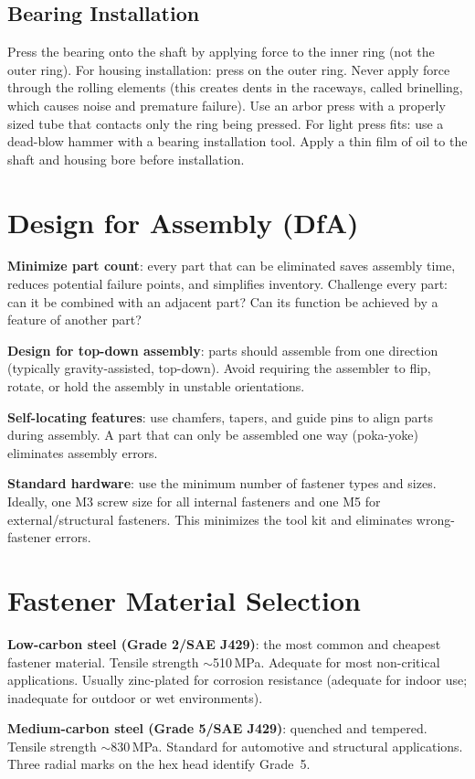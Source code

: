 \documentclass[11pt,letterpaper,twoside,openany]{book}
\begin{document}
\subsection{Bearing Installation}
Press the bearing onto the shaft by applying force to the inner ring (not the outer ring). For housing installation: press on the outer ring. Never apply force through the rolling elements (this creates dents in the raceways, called brinelling, which causes noise and premature failure). Use an arbor press with a properly sized tube that contacts only the ring being pressed. For light press fits: use a dead-blow hammer with a bearing installation tool. Apply a thin film of oil to the shaft and housing bore before installation.

\section{Design for Assembly (DfA)}
\textbf{Minimize part count}: every part that can be eliminated saves assembly time, reduces potential failure points, and simplifies inventory. Challenge every part: can it be combined with an adjacent part? Can its function be achieved by a feature of another part?

\textbf{Design for top-down assembly}: parts should assemble from one direction (typically gravity-assisted, top-down). Avoid requiring the assembler to flip, rotate, or hold the assembly in unstable orientations.

\textbf{Self-locating features}: use chamfers, tapers, and guide pins to align parts during assembly. A part that can only be assembled one way (poka-yoke) eliminates assembly errors.

\textbf{Standard hardware}: use the minimum number of fastener types and sizes. Ideally, one M3 screw size for all internal fasteners and one M5 for external/structural fasteners. This minimizes the tool kit and eliminates wrong-fastener errors.
\section{Fastener Material Selection}
\textbf{Low-carbon steel (Grade 2/SAE J429)}: the most common and cheapest fastener material. Tensile strength $\sim$510\,MPa. Adequate for most non-critical applications. Usually zinc-plated for corrosion resistance (adequate for indoor use; inadequate for outdoor or wet environments).

\textbf{Medium-carbon steel (Grade 5/SAE J429)}: quenched and tempered. Tensile strength $\sim$830\,MPa. Standard for automotive and structural applications. Three radial marks on the hex head identify Grade~5.
\end{document}
